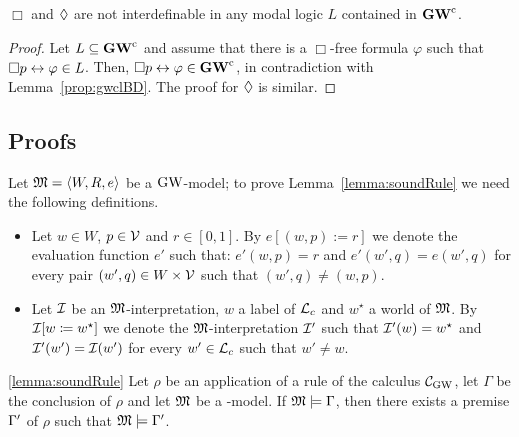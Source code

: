 \begin{proposition}\label{prop:defBD}
  $\Box$ and $\lozenge$ are not interdefinable in any modal logic $L$
  contained in $\mathbf{GW}^\mathrm{c}$.
\end{proposition}  

\begin{proof}
  Let $L\subseteq \mathbf{GW}^\mathrm{c}$ and assume
  that  there is
  a $\Box$-free formula $\varphi$ such that $\Box p\leftrightarrow\varphi\in
  L$. Then, $\Box p\leftrightarrow\varphi\in \mathbf{GW}^\mathrm{c}$,
  in contradiction with Lemma~\ref{prop:gwclBD}.  The proof for
  $\lozenge$ is similar.
\end{proof}



\subsection{Proofs}\label{app:proofs}

Let $\mathfrak{M}=\langle W,R,e \rangle$ be a $\mbox{$\mathrm{GW}$}$-model;
to prove Lemma~\ref{lemma:soundRule} we need the following definitions.
\begin{itemize}
\item Let $w\in W$, $p\in\mathcal{V}$ and $r\in[0,1]$. By $e[(w,p):=r]$ we
  denote the evaluation function $e'$ such that: $e'(w,p)=r$ and
  $e'(w',q)=e(w',q)$ for every pair $(w',q)\in W\times\mathcal{V}$ such that
  $(w',q)\neq(w,p)$.

\item Let $\mathcal{I}$ be an $\mathfrak{M}$-interpretation, $w$ a label of $\mathcal{L}_c$ and
  $w^\star$ a world of $\mathfrak{M}$.  By $\mathcal{I}[w \coloneqq w^\star]$ we denote
  the $\mathfrak{M}$-interpretation $\mathcal{I}'$ such that $\mathcal{I}'(w) = w^\star$ and
  $\mathcal{I}'(w')= \mathcal{I}(w')$ for every $w'\in \mathcal{L}_c$ such that $w'\neq w$.
\end{itemize}


\begin{lemmaref}{\ref{lemma:soundRule}}
  Let $\rho$ be an application of a rule of the calculus $\mathcal{C}_{\mathrm{GW}}$, let
  $\Gamma$ be the conclusion of $\rho$ and let $\mathfrak{M}$ be a \GWM-model.
  If $\mathfrak{M}\models\Gamma$, then there exists a premise $\Gamma'$ of $\rho$ such
  that $\mathfrak{M}\models\Gamma'$.
\end{lemmaref}

